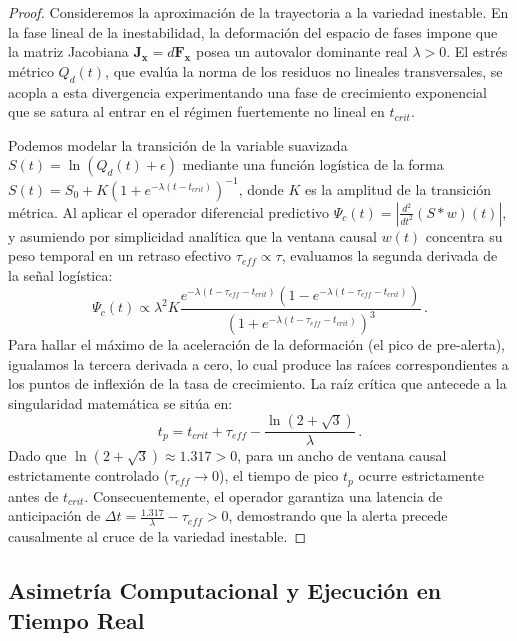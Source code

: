 \documentclass[11pt]{article}
\begin{document}
\begin{proof}
Consideremos la aproximación de la trayectoria a la variedad inestable. En la fase lineal de la inestabilidad, la deformación del espacio de fases impone que la matriz Jacobiana $\mathbf{J}_{\mathbf{x}} = d\mathbf{F}_{\mathbf{x}}$ posea un autovalor dominante real $\lambda > 0$. El estrés métrico $Q_d(t)$, que evalúa la norma de los residuos no lineales transversales, se acopla a esta divergencia experimentando una fase de crecimiento exponencial que se satura al entrar en el régimen fuertemente no lineal en $t_{crit}$. 

Podemos modelar la transición de la variable suavizada $S(t) = \ln(Q_d(t) + \epsilon)$ mediante una función logística de la forma $S(t) = S_0 + K(1 + e^{-\lambda(t - t_{crit})})^{-1}$, donde $K$ es la amplitud de la transición métrica. Al aplicar el operador diferencial predictivo $\Psi_c(t) = \left| \frac{d^2}{dt^2} (S * w)(t) \right|$, y asumiendo por simplicidad analítica que la ventana causal $w(t)$ concentra su peso temporal en un retraso efectivo $\tau_{eff} \propto \tau$, evaluamos la segunda derivada de la señal logística:
\begin{equation}
    \Psi_c(t) \propto \lambda^2 K \frac{e^{-\lambda(t - \tau_{eff} - t_{crit})} (1 - e^{-\lambda(t - \tau_{eff} - t_{crit})})}{(1 + e^{-\lambda(t - \tau_{eff} - t_{crit})})^3} \,.
\end{equation}
Para hallar el máximo de la aceleración de la deformación (el pico de pre-alerta), igualamos la tercera derivada a cero, lo cual produce las raíces correspondientes a los puntos de inflexión de la tasa de crecimiento. La raíz crítica que antecede a la singularidad matemática se sitúa en:
\begin{equation}
    t_p = t_{crit} + \tau_{eff} - \frac{\ln(2 + \sqrt{3})}{\lambda} \,.
\end{equation}
Dado que $\ln(2+\sqrt{3}) \approx 1.317 > 0$, para un ancho de ventana causal estrictamente controlado ($\tau_{eff} \to 0$), el tiempo de pico $t_p$ ocurre estrictamente antes de $t_{crit}$. Consecuentemente, el operador garantiza una latencia de anticipación de $\Delta t = \frac{1.317}{\lambda} - \tau_{eff} > 0$, demostrando que la alerta precede causalmente al cruce de la variedad inestable.
\end{proof}

\subsection{Asimetría Computacional y Ejecución en Tiempo Real}
\end{document}
